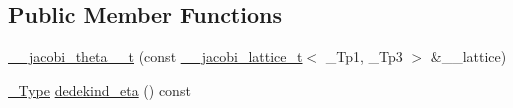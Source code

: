 \subsection*{Public Member Functions}
\begin{DoxyCompactItemize}
\item 
\hyperlink{structstd_1_1____detail_1_1____jacobi__theta__0__t_ab93acbb79590d3d0bf8f28ae018be613}{\+\_\+\+\_\+jacobi\+\_\+theta\+\_\+\_\+t} (const \hyperlink{structstd_1_1____detail_1_1____jacobi__lattice__t}{\+\_\+\+\_\+jacobi\+\_\+lattice\+\_\+t}$<$ \+\_\+\+Tp1, \+\_\+\+Tp3 $>$ \&\+\_\+\+\_\+lattice)
\item 
\hyperlink{structstd_1_1____detail_1_1____jacobi__theta__0__t_a4aebcbdd8f3ab416a2fa770aa3784d63}{\+\_\+\+Type} \hyperlink{structstd_1_1____detail_1_1____jacobi__theta__0__t_a7d1ad96ae4b231ad460f2ba3ce9b5061}{dedekind\+\_\+eta} () const
\end{DoxyCompactItemize}
